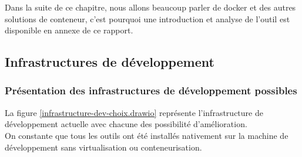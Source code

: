 \documentclass[
    iai, %
    il, %
]{heig-tb}
\begin{document}
Dans la suite de ce chapitre, nous allons beaucoup parler de \Gls{docker} et des autres solutions de \Gls{conteneur}, c'est pourquoi une introduction et analyse de l'outil est disponible en annexe de ce rapport.

\subsection{Infrastructures de développement}

\subsubsection{Présentation des infrastructures de développement possibles}

La figure \ref{infrastructure-dev-choix.drawio} représente l'infrastructure de développement actuelle avec chacune des possibilité d'amélioration. \\
On constante que tous les outils ont été installés nativement sur la machine de développement sans virtualisation ou conteneurisation.
\end{document}
